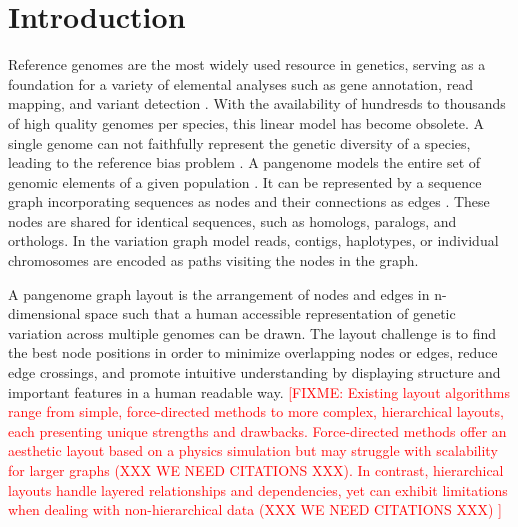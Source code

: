 \documentclass{bioinfo}
\theoremstyle{definition}
\newcommand{\red}[1]{{\textcolor{Red}{#1}}}
\newcommand{\FIXME}[1]{\red{[FIXME: #1]}}
\begin{document}
\section{Introduction}
Reference genomes are the most widely used resource in genetics, serving as a foundation for a variety of elemental analyses
such as gene annotation, read mapping, and variant detection \citep{Singh2022}.
With the availability of hundresds to thousands of high quality genomes per species, this linear model has become obsolete.
A single genome can not faithfully represent the genetic diversity of a species, leading to the reference bias problem \citep{Ballouz2019}.
A pangenome models the entire set of genomic elements of a given population \citep{Tettelin_2008,cpang2018,Eizenga_2020, Sherman_2020}.
It can be represented by a sequence graph incorporating sequences as nodes and their connections as edges \citep{Hein1989}.
These nodes are shared for identical sequences, such as homologs, paralogs, and orthologs.
In the variation graph model \citep{Garrison:2018} reads, contigs, haplotypes, or individual chromosomes are encoded as paths visiting the nodes in the graph.

A pangenome graph layout is the arrangement of nodes and edges in n-dimensional space such that a human accessible representation of genetic variation across multiple genomes can be drawn.
The layout challenge is to find the best node positions in order to minimize overlapping nodes or edges, reduce edge crossings, and promote intuitive understanding by displaying structure and important features in a human readable way.
\FIXME{
	Existing layout algorithms range from simple, force-directed methods to more complex, hierarchical layouts, each presenting unique strengths and drawbacks.
	Force-directed methods offer an aesthetic layout based on a physics simulation but may struggle with scalability for larger graphs (XXX WE NEED CITATIONS XXX).
	In contrast, hierarchical layouts handle layered relationships and dependencies, yet can exhibit limitations when dealing with non-hierarchical data (XXX WE NEED CITATIONS XXX)
}
\end{document}
